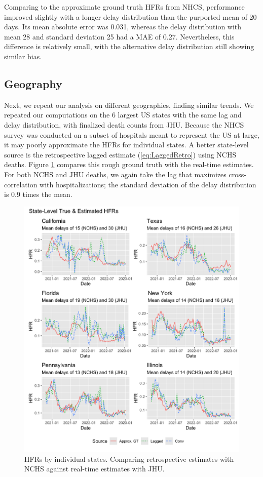 \documentclass{article}
\begin{document}
Comparing to the approximate ground truth HFRs from NHCS, performance improved slightly with a longer delay distribution than the purported mean of 20 days. Its mean absolute error was 0.031, whereas the delay distribution with mean 28 and standard deviation 25 had a MAE of 0.27. Nevertheless, this difference is relatively small, with the alternative delay distribution still showing similar bias.

\subsection{Geography}

Next, we repeat our analysis on different geographies, finding similar trends. We repeated our computations on the 6 largest US states with the same lag and delay distribution, with finalized death counts from JHU. Because the NHCS survey was conducted on a subset of hospitals meant to represent the US at large, it may poorly approximate the HFRs for individual states. A better state-level source is the retrospective lagged estimate (\ref{eq:LaggedRetro}) using NCHS deaths. Figure \ref{fig:state-level} compares this rough ground truth with the real-time estimates. For both NCHS and JHU deaths, we again take the lag that maximizes cross-correlation with hospitalizations; the standard deviation of the delay distribution is 0.9 times the mean. 

 \begin{figure}
     \centering
     \includegraphics[width=0.8\linewidth]{Figs/state_level_hfrs.png}
     \caption{HFRs by individual states. Comparing retrospective estimates with NCHS against real-time estimates with JHU.}
     \label{fig:state-level}
 \end{figure}
\end{document}
